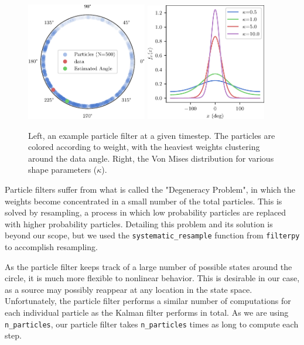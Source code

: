 \documentclass[11pt]{amsart}
\begin{document}
\begin{figure}[htp]
    \centering
    \includegraphics[width=0.47\textwidth]{actual_paper_graphs/particle_filter_example.pdf}\hfill
    \includegraphics[width=0.47\textwidth]{actual_paper_graphs/von_mises_pdf.pdf}\hfill
    \caption{Left, an example particle filter at a given timestep. The particles are colored according to weight, with the heaviest weights clustering around the data angle. Right, the Von Mises distribution for various shape parameters ($\kappa$).}
    \label{fig:particle_filter_stuff}
\end{figure}

Particle filters suffer from what is called the "Degeneracy Problem", in which the weights become concentrated in a small number of the total particles. This is solved by resampling, a process in which low probability particles are replaced 
with higher probability particles. Detailing this problem and its solution is beyond our scope, but we used the \lstinline{systematic_resample} function from \lstinline{filterpy} to accomplish resampling.

As the particle filter keeps track of a large number of possible states around the circle, it is much more flexible to nonlinear behavior. This is desirable in our case, as a source may possibly reappear at any 
location in the state space. Unfortunately, the particle filter performs a similar number of computations for each individual particle as the Kalman filter performs in total. As we are using \lstinline{n_particles}, our particle filter takes \lstinline{n_particles} 
times as long to compute each step.
\end{document}
